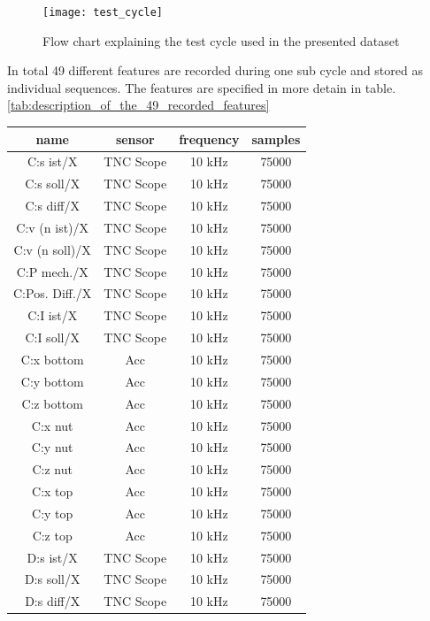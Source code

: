 \begin{figure}[htpb]
  \centering
  \texttt{[image: test\_cycle]}
  \caption {Flow chart explaining the test cycle used in the presented dataset}
  \label{fig:test_cycle}
\end{figure}

In total 49 different features are recorded during one sub cycle and stored as individual sequences. The features are specified in more detain in table. \ref{tab:description_of_the_49_recorded_features}

\begin{center}
\begin{longtable}{||c c c c||} 
 \hline
 name & sensor & frequency & samples \\ [0.5ex] 
 \hline\hline
 C:s ist/X & TNC Scope & 10 kHz & 75000 \\ 
 \hline
 C:s soll/X & TNC Scope & 10 kHz & 75000 \\ 
 \hline
 C:s diff/X & TNC Scope & 10 kHz & 75000 \\ 
 \hline
 C:v (n ist)/X & TNC Scope & 10 kHz & 75000 \\ 
 \hline
 C:v (n soll)/X& TNC Scope & 10 kHz & 75000 \\ 
 \hline
 C:P mech./X & TNC Scope & 10 kHz & 75000 \\ 
 \hline
 C:Pos. Diff./X & TNC Scope & 10 kHz & 75000 \\ 
 \hline
 C:I ist/X & TNC Scope & 10 kHz & 75000 \\ 
  \hline
 C:I soll/X & TNC Scope & 10 kHz & 75000 \\ 
 \hline
 C:x bottom & Acc & 10 kHz & 75000 \\ 
 \hline
 C:y bottom & Acc & 10 kHz & 75000 \\ 
 \hline
 C:z bottom & Acc & 10 kHz & 75000 \\ 
 \hline
 C:x nut & Acc & 10 kHz & 75000 \\ 
 \hline
 C:y nut & Acc & 10 kHz & 75000 \\ 
 \hline
 C:z nut & Acc & 10 kHz & 75000 \\ 
 \hline
  C:x top & Acc & 10 kHz & 75000 \\ 
 \hline
 C:y top & Acc & 10 kHz & 75000 \\ 
 \hline
 C:z top & Acc & 10 kHz & 75000 \\ 
 \hline
 D:s ist/X & TNC Scope & 10 kHz & 75000 \\
 \hline
 D:s soll/X & TNC Scope & 10 kHz & 75000 \\ 
 \hline
 D:s diff/X & TNC Scope & 10 kHz & 75000 \\ 

\end{longtable}
\end{center}
